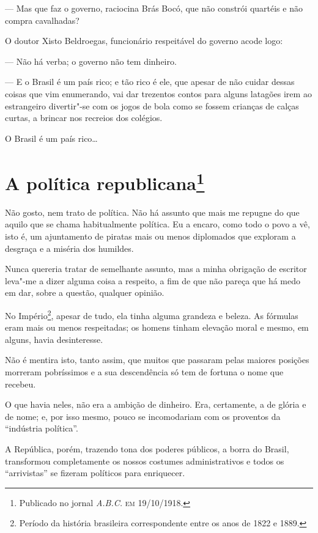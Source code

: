 --- Mas que faz o governo, raciocina Brás Bocó, que não constrói quartéis
e não compra cavalhadas?

O doutor Xisto Beldroegas, funcionário respeitável do governo acode
logo:

--- Não há verba; o governo não tem dinheiro.

--- E o Brasil é um país rico; e tão rico é ele, que apesar de não cuidar
dessas coisas que vim enumerando, vai dar trezentos contos para alguns
latagões irem ao estrangeiro divertir"-se com os jogos de bola como se
fossem crianças de calças curtas, a brincar nos recreios dos colégios.

O Brasil é um país rico\ldots{}


\chapter[A política republicana]{A política republicana\footnote[*]{Publicado no jornal \emph{A.B.C.} \textsc{em} 19/10/1918.}}

Não gosto, nem trato de política. Não há assunto que mais me repugne do
que aquilo que se chama habitualmente política. Eu a encaro, como todo o
povo a vê, isto é, um ajuntamento de piratas mais ou menos diplomados
que exploram a desgraça e a miséria dos humildes.

Nunca quereria tratar de semelhante assunto, mas a minha obrigação de
escritor leva"-me a dizer alguma coisa a respeito, a fim de que não
pareça que há medo em dar, sobre a questão, qualquer opinião.

No Império\footnote{Período da história brasileira correspondente entre
  os anos de 1822 e 1889.}, apesar de tudo, ela tinha alguma grandeza e
beleza. As fórmulas eram mais ou menos respeitadas; os homens tinham
elevação moral e mesmo, em alguns, havia desinteresse.

Não é mentira isto, tanto assim, que muitos que passaram pelas maiores
posições morreram pobríssimos e a sua descendência só tem de fortuna o
nome que recebeu.

O que havia neles, não era a ambição de dinheiro. Era, certamente, a de
glória e de nome; e, por isso mesmo, pouco se incomodariam com os
proventos da ``indústria política''.

A República, porém, trazendo tona dos poderes públicos, a borra do
Brasil, transformou completamente os nossos costumes administrativos e
todos os ``arrivistas'' se fizeram políticos para enriquecer.

